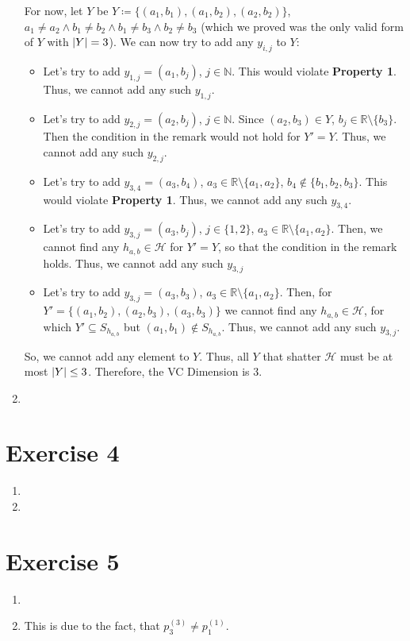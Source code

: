 \documentclass[12pt]{article}
\DeclarePairedDelimiter\abs{\lvert}{\rvert}
\begin{document}
\begin{enumerate}[label=(\alph*)]
			For now, let $Y$ be $Y \coloneqq \{(a_1, b_1), (a_1, b_2), (a_2, b_2)\}$, $a_1 \neq a_2 \land b_1 \neq b_2 \land b_1 \neq b_3 \land b_2 \neq b_3$ (which we proved was the only valid form of $Y$ with $\abs{Y} = 3$). We can now try to add any $y_{i,j}$ to $Y$:
			\begin{itemize}
				\item	Let's try to add $y_{1,j} = (a_1, b_j)$, $j \in \mathbb{N}$. This would violate \textbf{Property 1}. Thus, we cannot add any such $y_{1,j}$.

				\item	Let's try to add $y_{2,j} = (a_2, b_j)$, $j \in \mathbb{N}$. Since $(a_2, b_3) \in Y$, $b_j \in \mathbb{R}\setminus\{b_3\}$. Then the condition in the remark would not hold for $Y' = Y$. Thus, we cannot add any such $y_{2,j}$.

				\item	Let's try to add $y_{3,4} = (a_3, b_4)$, $a_3 \in \mathbb{R}\setminus\{a_1, a_2\}$, $b_4 \not\in \{b_1, b_2, b_3\}$. This would violate \textbf{Property 1}. Thus, we cannot add any such $y_{3,4}$.
				\item	Let's try to add $y_{3,j} = (a_3, b_j)$, $j \in \{1,2\}$, $a_3 \in \mathbb{R}\setminus\{a_1, a_2\}$. Then, we cannot find any $h_{a,b} \in \mathcal{H}$ for $Y' = Y$, so that the condition in the remark holds. Thus, we cannot add any such $y_{3,j}$
				\item	Let's try to add $y_{3,j} = (a_3, b_3)$, $a_3 \in \mathbb{R}\setminus\{a_1, a_2\}$. Then, for $Y' = \{(a_1, b_2), (a_2,b_3), (a_3, b_3)\}$ we cannot find any $h_{a,b} \in \mathcal{H}$, for which $Y' \subseteq S_{h_{a,b}}$ but $(a_1, b_1) \not\in S_{h_{a,b}}$. Thus, we cannot add any such $y_{3,j}$.
			\end{itemize}
			So, we cannot add any element to $Y$. Thus, all $Y$ that shatter $\mathcal{H}$ must be at most $\abs{Y} \leq 3$. Therefore, the VC Dimension is $3$.
	\item
\end{enumerate}

\section*{Exercise 4}
\begin{enumerate}[label=(\alph*)]
	\item
	\item
\end{enumerate}

\section*{Exercise 5}
\begin{enumerate}[label=(\alph*)]
	\item	
	\item	This is due to the fact, that $p_3^{(3)} \neq p_1^{(1)}$.
\end{enumerate}
\end{document}

